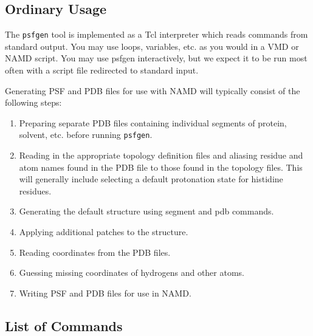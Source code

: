 \subsection{Ordinary Usage}

The \verb#psfgen# tool is implemented as a Tcl interpreter which reads
commands from standard output.  You may use loops, variables, etc. as
you would in a VMD or NAMD script.  You may use psfgen interactively,
but we expect it to be run most often with a script file redirected to
standard input.

Generating PSF and PDB files for use with NAMD will typically consist of
the following steps:

\begin{enumerate}
\item Preparing separate PDB files containing individual segments of
protein, solvent, etc. before running \verb#psfgen#.
\item Reading in the appropriate topology definition files and aliasing
residue and atom names found in the PDB file to those found in the topology
files.  This will generally include selecting a default protonation state
for histidine residues.
\item Generating the default structure using segment and pdb commands.
\item Applying additional patches to the structure.
\item Reading coordinates from the PDB files.
\item Guessing missing coordinates of hydrogens and other atoms.
\item Writing PSF and PDB files for use in NAMD.
\end{enumerate}


\subsection{List of Commands}


